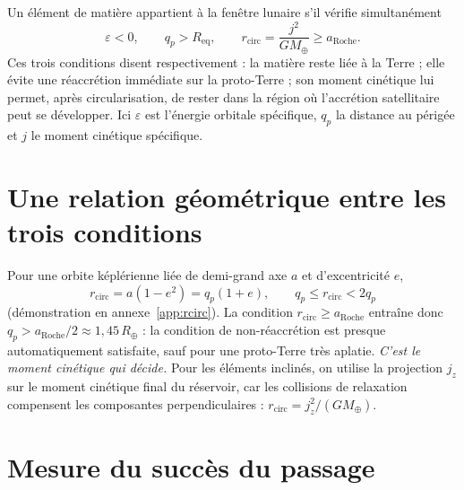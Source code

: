 \documentclass[11pt,a4paper,openany]{report}
\newcommand{\Mt}{M_{\oplus}}
\newcommand{\Rt}{R_{\oplus}}
\newcommand{\Req}{R_{\mathrm{eq}}}
\newcommand{\aR}{a_{\mathrm{Roche}}}
\begin{document}
Un élément de matière appartient à la fenêtre lunaire s'il vérifie simultanément
\begin{equation}
\boxed{\;\varepsilon<0,\qquad q_p>\Req,\qquad r_{\mathrm{circ}}=\frac{j^2}{G\Mt}\ge\aR.\;}
\label{eq:fenetre}
\end{equation}
Ces trois conditions disent respectivement : la matière reste liée à la Terre ; elle évite une
réaccrétion immédiate sur la proto-Terre ; son moment cinétique lui permet, après
circularisation, de rester dans la région où l'accrétion satellitaire peut se développer. Ici
$\varepsilon$ est l'énergie orbitale spécifique, $q_p$ la distance au périgée et $j$ le moment
cinétique spécifique.

\section{Une relation géométrique entre les trois conditions}

Pour une orbite képlérienne liée de demi-grand axe $a$ et d'excentricité $e$,
\begin{equation}
r_{\mathrm{circ}}=a(1-e^2)=q_p(1+e),\qquad q_p\le r_{\mathrm{circ}}<2q_p
\label{eq:rcirc-qp}
\end{equation}
(démonstration en annexe~\ref{app:rcirc}). La condition $r_{\mathrm{circ}}\ge\aR$ entraîne donc
$q_p>\aR/2\approx1{,}45\,\Rt$ : la condition de non-réaccrétion est presque automatiquement
satisfaite, sauf pour une proto-Terre très aplatie. \emph{C'est le moment cinétique qui décide.}
Pour les éléments inclinés, on utilise la projection $j_z$ sur le moment cinétique final du
réservoir, car les collisions de relaxation compensent les composantes perpendiculaires :
$r_{\mathrm{circ}}=j_z^2/(G\Mt)$.

\section{Mesure du succès du passage}
\end{document}

